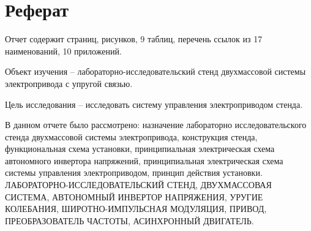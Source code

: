 \section*{Реферат}
    Отчет содержит  страниц,  рисунков, 9
    таблиц, перечень ссылок из 17 наименований, 10 приложений.
    
    Объект изучения -- лабораторно-исследовательский стенд двухмассовой системы
    электропривода с упругой связью.
    
    Цель исследования -- исследовать систему управления электроприводом стенда.

    В данном отчете было рассмотрено: назначение
    лабораторно исследовательского стенда двухмассовой системы
    электропривода, конструкция стенда, функциональная схема установки,
    принципиальная электрическая схема автономного инвертора напряжений,
    принципиальная электрическая схема системы управления электроприводом,
    принцип действия установки.\\ 

    \MakeTextUppercase{%
        Лабораторно-исследовательский стенд, двухмассовая система, автономный
        инвертор напряжения, уругие колебания, широтно-импульсная модуляция,
        привод, преобразователь частоты, асинхронный двигатель.  
    }
